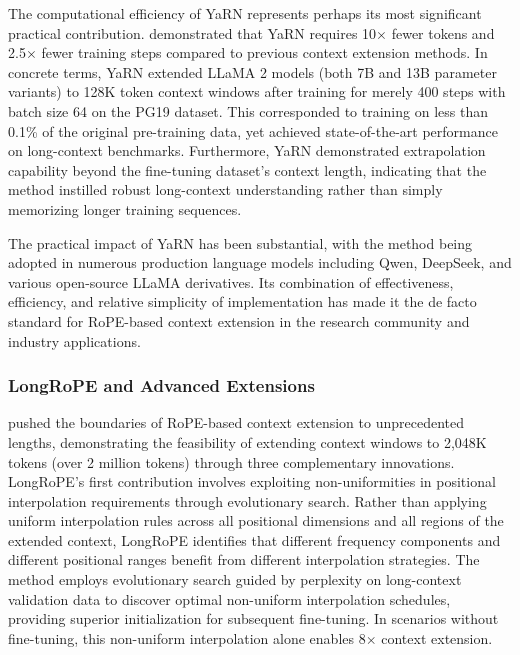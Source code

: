 \documentclass[11pt,letterpaper]{article}
\begin{document}
The computational efficiency of YaRN represents perhaps its most significant practical contribution. \cite{peng2024yarn} demonstrated that YaRN requires 10$\times$ fewer tokens and 2.5$\times$ fewer training steps compared to previous context extension methods. In concrete terms, YaRN extended LLaMA 2 models (both 7B and 13B parameter variants) to 128K token context windows after training for merely 400 steps with batch size 64 on the PG19 dataset. This corresponded to training on less than 0.1\% of the original pre-training data, yet achieved state-of-the-art performance on long-context benchmarks. Furthermore, YaRN demonstrated extrapolation capability beyond the fine-tuning dataset's context length, indicating that the method instilled robust long-context understanding rather than simply memorizing longer training sequences.

The practical impact of YaRN has been substantial, with the method being adopted in numerous production language models including Qwen, DeepSeek, and various open-source LLaMA derivatives. Its combination of effectiveness, efficiency, and relative simplicity of implementation has made it the de facto standard for RoPE-based context extension in the research community and industry applications.

\subsubsection{LongRoPE and Advanced Extensions}

\cite{ding2024longrope} pushed the boundaries of RoPE-based context extension to unprecedented lengths, demonstrating the feasibility of extending context windows to 2,048K tokens (over 2 million tokens) through three complementary innovations. LongRoPE's first contribution involves exploiting non-uniformities in positional interpolation requirements through evolutionary search. Rather than applying uniform interpolation rules across all positional dimensions and all regions of the extended context, LongRoPE identifies that different frequency components and different positional ranges benefit from different interpolation strategies. The method employs evolutionary search guided by perplexity on long-context validation data to discover optimal non-uniform interpolation schedules, providing superior initialization for subsequent fine-tuning. In scenarios without fine-tuning, this non-uniform interpolation alone enables 8$\times$ context extension.
\end{document}
